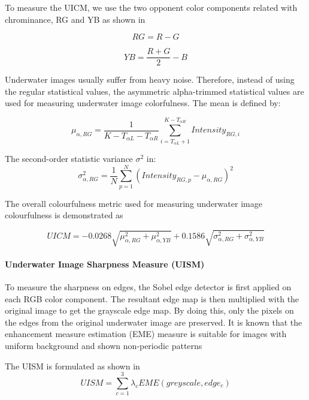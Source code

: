 \documentclass[a4paper]{article}
\begin{document}
To measure the UICM, we use the two opponent color components related with chrominance, RG and YB as shown in

\begin{equation}
    \label{eq:uicm1}
    RG = R - G
\end{equation}

\begin{equation}
    \label{eq:uicm2}
    YB = \frac{R + G}{2} - B
\end{equation}

Underwater images usually suffer from heavy noise. Therefore, instead of using the regular
statistical values, the asymmetric alpha-trimmed statistical values are used for measuring
underwater image colorfulness. The mean is defined by:

\begin{equation}
    \label{eq:uicm-mean}
    \mu_{\alpha,RG} = \frac{1}{K - T_{\alpha L} - T_{\alpha R}} \sum_{i=T_{\alpha L} + 1}^{K-T_{\alpha R}} Intensity_{RG,i}
\end{equation}

The second-order statistic variance $\sigma^2$ in:
\begin{equation}
    \label{eq:uicm-variance}
    \sigma^2_{\alpha,RG} = \frac{1}{N} \sum_{p=1}^{N}(Intensity_{RG, p} - \mu_{\alpha,RG})^2
\end{equation}

The overall colourfulness metric used for measuring underwater image colourfulness is demonstrated as

\begin{equation}
    \label{eq:uicm-final}
    UICM = -0.0268\sqrt{\mu^2_{\alpha,RG} + \mu^2_{\alpha,YB}} + 0.1586\sqrt{\sigma^2_{\alpha,RG} + \sigma^2_{\alpha,YB}}
\end{equation}

\paragraph{Underwater Image Sharpness Measure (UISM)}
To measure the sharpness on edges, the Sobel edge detector is first applied on each RGB color component. The resultant edge map is then multiplied with the original image to get the grayscale edge map. By doing this, only the pixels on the edges from the original underwater image are preserved. It is known that the enhancement measure estimation (EME) measure is suitable for images with uniform background and shown non-periodic patterns

The UISM is formulated as shown in
\begin{equation}
    \label{eq:uism}
    UISM = \sum_{c=1}^3\lambda_c EME(greyscale, edge_c)
\end{equation}
\end{document}
